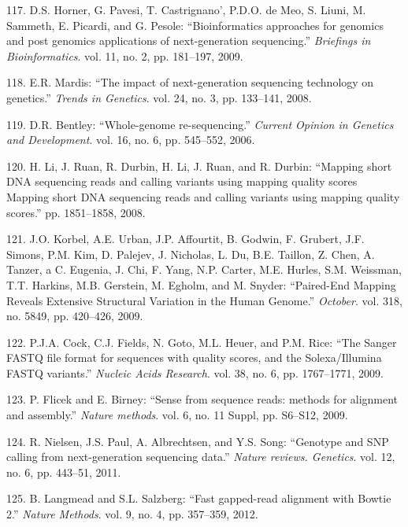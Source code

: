 \documentclass[12pt,twoside]{reedthesis}
\theoremstyle{definition}
\theoremstyle{definition}
\theoremstyle{remark}
\begin{document}
  \hypertarget{ref-Horner2009}{}
  117. D.S. Horner, G. Pavesi, T. Castrignano', P.D.O. de Meo, S. Liuni,
  M. Sammeth, E. Picardi, and G. Pesole: ``Bioinformatics approaches for
  genomics and post genomics applications of next-generation sequencing.''
  \emph{Briefings in Bioinformatics}. vol. 11, no. 2, pp. 181--197, 2009.
  
  \hypertarget{ref-Mardis2008}{}
  118. E.R. Mardis: ``The impact of next-generation sequencing technology
  on genetics.'' \emph{Trends in Genetics}. vol. 24, no. 3, pp. 133--141,
  2008.
  
  \hypertarget{ref-Bentley2006}{}
  119. D.R. Bentley: ``Whole-genome re-sequencing.'' \emph{Current Opinion
  in Genetics and Development}. vol. 16, no. 6, pp. 545--552, 2006.
  
  \hypertarget{ref-Li2008}{}
  120. H. Li, J. Ruan, R. Durbin, H. Li, J. Ruan, and R. Durbin: ``Mapping
  short DNA sequencing reads and calling variants using mapping quality
  scores Mapping short DNA sequencing reads and calling variants using
  mapping quality scores.'' pp. 1851--1858, 2008.
  
  \hypertarget{ref-Korbel2009}{}
  121. J.O. Korbel, A.E. Urban, J.P. Affourtit, B. Godwin, F. Grubert,
  J.F. Simons, P.M. Kim, D. Palejev, J. Nicholas, L. Du, B.E. Taillon, Z.
  Chen, A. Tanzer, a C. Eugenia, J. Chi, F. Yang, N.P. Carter, M.E.
  Hurles, S.M. Weissman, T.T. Harkins, M.B. Gerstein, M. Egholm, and M.
  Snyder: ``Paired-End Mapping Reveals Extensive Structural Variation in
  the Human Genome.'' \emph{October}. vol. 318, no. 5849, pp. 420--426,
  2009.
  
  \hypertarget{ref-Cock2009}{}
  122. P.J.A. Cock, C.J. Fields, N. Goto, M.L. Heuer, and P.M. Rice: ``The
  Sanger FASTQ file format for sequences with quality scores, and the
  Solexa/Illumina FASTQ variants.'' \emph{Nucleic Acids Research}. vol.
  38, no. 6, pp. 1767--1771, 2009.
  
  \hypertarget{ref-Flicek2009}{}
  123. P. Flicek and E. Birney: ``Sense from sequence reads: methods for
  alignment and assembly.'' \emph{Nature methods}. vol. 6, no. 11 Suppl,
  pp. S6--S12, 2009.
  
  \hypertarget{ref-Nielsen2011}{}
  124. R. Nielsen, J.S. Paul, A. Albrechtsen, and Y.S. Song: ``Genotype
  and SNP calling from next-generation sequencing data.'' \emph{Nature
  reviews. Genetics}. vol. 12, no. 6, pp. 443--51, 2011.
  
  \hypertarget{ref-Langmead2012}{}
  125. B. Langmead and S.L. Salzberg: ``Fast gapped-read alignment with
  Bowtie 2.'' \emph{Nature Methods}. vol. 9, no. 4, pp. 357--359, 2012.
  
\end{document}
